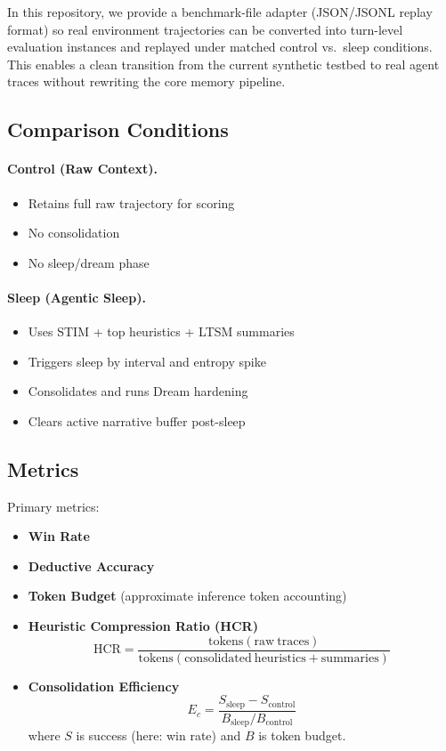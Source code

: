\documentclass{article}
\begin{document}
In this repository, we provide a benchmark-file adapter (JSON/JSONL replay format) so real environment trajectories can be converted into turn-level evaluation instances and replayed under matched control vs.\ sleep conditions. This enables a clean transition from the current synthetic testbed to real agent traces without rewriting the core memory pipeline.

\subsection{Comparison Conditions}

\paragraph{Control (Raw Context).}
\begin{itemize}[leftmargin=1.25em]
\item Retains full raw trajectory for scoring
\item No consolidation
\item No sleep/dream phase
\end{itemize}

\paragraph{Sleep (Agentic Sleep).}
\begin{itemize}[leftmargin=1.25em]
\item Uses STIM + top heuristics + LTSM summaries
\item Triggers sleep by interval and entropy spike
\item Consolidates and runs Dream hardening
\item Clears active narrative buffer post-sleep
\end{itemize}

\subsection{Metrics}

Primary metrics:

\begin{itemize}[leftmargin=1.25em]
\item \textbf{Win Rate}
\item \textbf{Deductive Accuracy}
\item \textbf{Token Budget} (approximate inference token accounting)
\item \textbf{Heuristic Compression Ratio (HCR)}
\begin{equation}
\mathrm{HCR} = \frac{\mathrm{tokens}(\mathrm{raw\ traces})}{\mathrm{tokens}(\mathrm{consolidated\ heuristics + summaries})}
\end{equation}
\item \textbf{Consolidation Efficiency}
\begin{equation}
E_c = \frac{S_{\mathrm{sleep}} - S_{\mathrm{control}}}{B_{\mathrm{sleep}} / B_{\mathrm{control}}}
\end{equation}
where $S$ is success (here: win rate) and $B$ is token budget.
\end{itemize}
\end{document}
